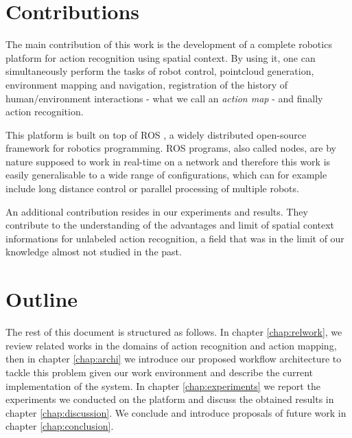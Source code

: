 \section{Contributions}
The main contribution of this work is the development of a complete robotics platform for action recognition using spatial context. By using it, one can simultaneously perform the tasks of robot control, pointcloud generation, environment mapping and navigation, registration of the history of human/environment interactions - what we call an \emph{action map} - and finally action recognition.

This platform is built on top of ROS \cite{ROS}, a widely distributed open-source framework for robotics programming. ROS programs, also called nodes, are by nature supposed to work in real-time on a network and therefore this work is easily generalisable to a wide range of configurations, which can for example include long distance control or parallel processing of multiple robots.

An additional contribution resides in our experiments and results. They contribute to the understanding of the advantages and limit of spatial context informations for unlabeled action recognition, a field that was in the limit of our knowledge almost not studied in the past. 

\section{Outline}
The rest of this document is structured as follows. In chapter \ref{chap:relwork}, we review related works in the domains of action recognition and action mapping, then in chapter \ref{chap:archi} we introduce our proposed workflow architecture to tackle this problem given our work environment and describe the current implementation of the system. In chapter \ref{chap:experiments} we report the experiments we conducted on the platform and discuss the obtained results in chapter \ref{chap:discussion}. We conclude and introduce proposals of future work in chapter \ref{chap:conclusion}. 